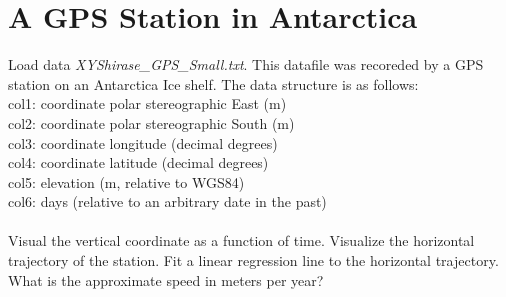 \section{A GPS Station in Antarctica}

Load data \textit{XYShirase\_GPS\_Small.txt}. This datafile was recoreded by a GPS station on an Antarctica Ice shelf. The data structure is as follows:\\

col1: coordinate polar stereographic East (m)\\
col2: coordinate polar stereographic South (m)\\
col3: coordinate longitude (decimal degrees)\\
col4: coordinate latitude (decimal degrees)\\
col5: elevation (m, relative to WGS84)\\
col6: days (relative to an arbitrary date in the past)\\
\\
Visual the vertical coordinate as a function of time. Visualize the horizontal trajectory of the station. Fit a linear regression line to the horizontal trajectory. What is the approximate speed in meters per year?
